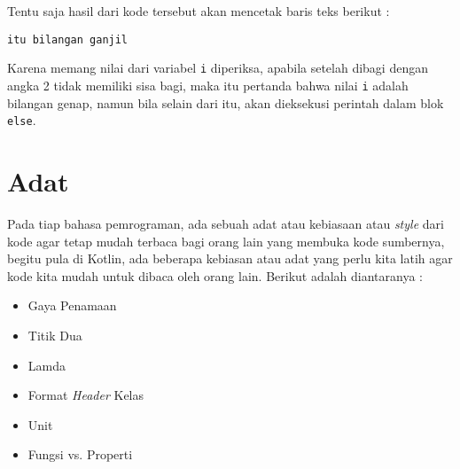 Tentu saja hasil dari kode tersebut akan mencetak baris teks berikut :

\begin{lstlisting}
itu bilangan ganjil
\end{lstlisting}

Karena memang nilai dari variabel \texttt{i} diperiksa, apabila setelah dibagi dengan angka 2 tidak memiliki sisa bagi, maka itu pertanda bahwa nilai \texttt{i} adalah bilangan genap, namun bila selain dari itu, akan dieksekusi perintah dalam blok \texttt{else}.

\section{Adat}

Pada tiap bahasa pemrograman, ada sebuah adat atau kebiasaan atau \textit{style} dari kode agar tetap mudah terbaca bagi orang lain yang membuka kode sumbernya, begitu pula di Kotlin, ada beberapa kebiasan atau adat yang perlu kita latih agar kode kita mudah untuk dibaca oleh orang lain. Berikut adalah diantaranya :

\begin{itemize}
	\item Gaya Penamaan
	\item Titik Dua
	\item Lamda
	\item Format \textit{Header} Kelas
	\item Unit
	\item Fungsi vs. Properti
\end{itemize}